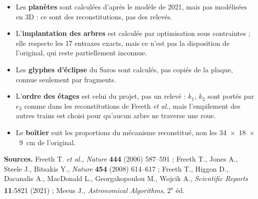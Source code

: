 \begin{attention}
\begin{itemize}
  \item Les \textbf{planètes} sont calculées d'après le modèle de 2021, mais pas modélisées en
        3D : ce sont des reconstitutions, pas des relevés.
  \item L'\textbf{implantation des arbres} est calculée par optimisation sous contraintes ; elle
        respecte les 17 entraxes exacts, mais ce n'est pas la disposition de l'original, qui
        reste partiellement inconnue.
  \item Les \textbf{glyphes d'éclipse} du Saros sont calculés, pas copiés de la plaque, connue
        seulement par fragments.
  \item L'\textbf{ordre des étages} est celui du projet, pas un relevé : $k_1$, $k_2$ sont
        portés par $e_3$ comme dans les reconstitutions de Freeth \textit{et al.}, mais
        l'empilement des autres trains est choisi pour qu'aucun arbre ne traverse une roue.
  \item Le \textbf{boîtier} suit les proportions du mécanisme reconstitué, non les
        34~$\times$~18~$\times$~9~cm de l'original.
\end{itemize}
\end{attention}

\vfill
\begin{tcolorbox}[enhanced,colback=parchemin,colframe=summit,arc=2mm,boxrule=0.6pt]
\small
\textbf{Sources.} Freeth T. \textit{et al.}, \textit{Nature} \textbf{444} (2006) 587–591 ;
Freeth T., Jones A., Steele J., Bitsakis Y., \textit{Nature} \textbf{454} (2008) 614–617 ;
Freeth T., Higgon D., Dacanalis A., MacDonald L., Georgakopoulou M., Wojcik A.,
\textit{Scientific Reports} \textbf{11}:5821 (2021) ; Meeus J., \textit{Astronomical
Algorithms}, 2\textsuperscript{e} éd.
\end{tcolorbox}


